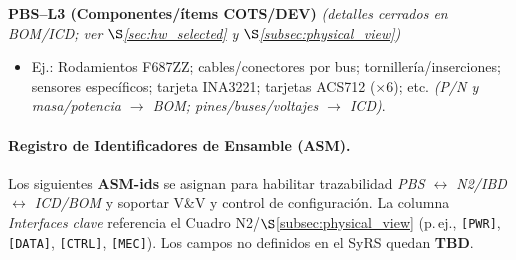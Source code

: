 \noindent\textbf{PBS--L3 (Componentes/ítems COTS/DEV)} \emph{(detalles cerrados en BOM/ICD; ver $\S$\ref{sec:hw_selected} y $\S$\ref{subsec:physical_view})} \cite{nasa_cm}
\begin{itemize}
  \item Ej.: Rodamientos F687ZZ; cables/conectores por bus; tornillería/inserciones; sensores específicos; tarjeta INA3221; tarjetas ACS712 (×6); etc. \emph{(P/N y masa/potencia $\rightarrow$ BOM; pines/buses/voltajes $\rightarrow$ ICD)}.
\end{itemize}

\paragraph{Registro de Identificadores de Ensamble (ASM).}
\label{subsec:asm_registry}

Los siguientes \textbf{ASM-ids} se asignan para habilitar trazabilidad \emph{PBS $\leftrightarrow$ N2/IBD $\leftrightarrow$ ICD/BOM} y soportar V\&V y control de configuración. La columna \emph{Interfaces clave} referencia el Cuadro N2/$\S$\ref{subsec:physical_view} (p.\,ej., \texttt{[PWR]}, \texttt{[DATA]}, \texttt{[CTRL]}, \texttt{[MEC]}). Los campos no definidos en el SyRS quedan \textbf{TBD}. \cite{nasa_cm}

